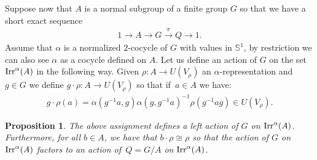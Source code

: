 \documentclass[pdftex]{sigma}
\def\S{\mathbb{S}}
\DeclareMathOperator{\Irr}{\textup{Irr}}
\newtheorem{Pro}[Th]{Proposition}
\theoremstyle{definition}
\numberwithin{equation}{section}
\begin{document}
Suppose now that $A$ is a normal subgroup of a finite group $G$ so that we have a short exact
sequence
\begin{gather*}
1\rightarrow A\rightarrow G\stackrel{\pi}{\rightarrow} Q\rightarrow 1.
\end{gather*}
Assume that $\alpha$ is a normalized $2$-cocycle of $G$ with values in $\S^{1}$,
by restriction we can also see $\alpha$ as a cocycle defined on $A$.
Let us define an action of $G$ on the set $\Irr^{\alpha}(A)$ in the following way.
Given $\rho\colon A\rightarrow U(V_{\rho})$ an $\alpha$-representation and $g\in G$ we define
$g\cdot \rho\colon A\rightarrow U(V_{\rho})$ so that if~$a\in A$ we have:
\begin{gather}\label{def:act}
g\cdot \rho(a)=\alpha(g^{-1}a,g)\alpha(g,g^{-1}a)^{-1}\rho(g^{-1}ag)\in U(V_{\rho}).
\end{gather}

\begin{Pro}
The above assignment defines a left action of $G$ on $\Irr^{\alpha}(A)$. Furthermore, for all
$b\in A$, we have that $b\cdot\rho\cong\rho$ so that the action of $G$ on $\Irr^{\alpha}(A)$
factors to an action of~$Q=G/A$ on $\Irr^{\alpha}(A)$.
\end{Pro}
\end{document}

